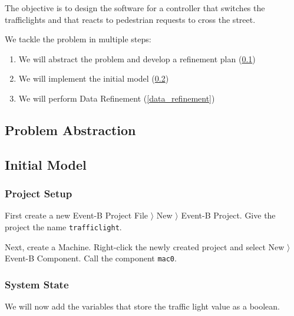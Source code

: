 The objective is to design the software for a controller that switches the trafficlights and that reacts to pedestrian requests to cross the street.

We tackle the problem in multiple steps:

\begin{enumerate}
	\item We will abstract the problem and develop a refinement plan (\ref{tutorial_tl_problem_abstraction})
	\item We will implement the initial model (\ref{tutorial_tl_initial_model})
	\item We will perform Data Refinement (\ref{data_refinement})
\end{enumerate}

\subsection{Problem Abstraction}
\label{tutorial_tl_problem_abstraction}

\subsection{Initial Model}
\label{tutorial_tl_initial_model}

\subsubsection{Project Setup}

First create a new Event-B Project \textsf{File $\rangle$ New $\rangle$ Event-B Project}.  Give the project the name \texttt{trafficlight}.

Next, create a Machine.  Right-click the newly created project and select \textsf{New $\rangle$ Event-B Component}.  Call the component \texttt{mac0}.


\subsubsection{System State}

We will now add the variables that store the traffic light value as a boolean.




